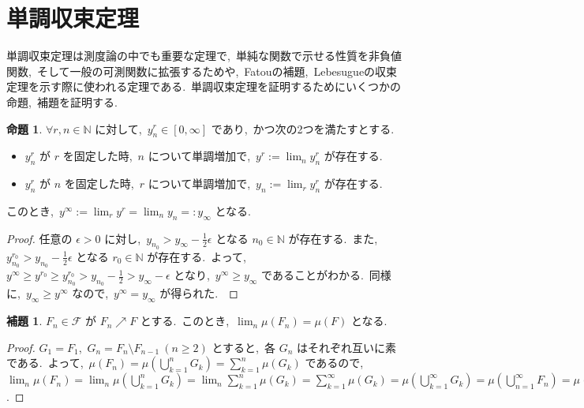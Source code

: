 \documentclass[a4j,11pt]{jarticle}
\theoremstyle{definition}
\newtheorem{lemma}[theorem]{補題}
\newtheorem{proposition}[theorem]{命題}
\begin{document}
\section*{単調収束定理}
単調収束定理は測度論の中でも重要な定理で,\ 単純な関数で示せる性質を非負値関数,\ そして一般の可測関数に拡張するためや,\ Fatouの補題,\ Lebesugueの収束定理を示す際に使われる定理である.\ 
単調収束定理を証明するためにいくつかの命題,\ 補題を証明する.\ 

\begin{proposition}\label{prop:doubly}
  $\forall r, n \in \mathbb{N}$
  に対して,\ 
  $y_n^r \in \left[ 0,\infty \right]$
  であり,\ かつ次の2つを満たすとする.\ 
  \begin{itemize}
    \item 
      $y_n^r$
      が
      $r$
      を固定した時,\ 
      $n$
      について単調増加で,\ 
      $y^r:=\lim_n y_n^r$
      が存在する.\ 
    \item
      $y_n^r$
      が
      $n$
      を固定した時,\ 
      $r$
      について単調増加で,\ 
      $y_n:=\lim_r y_n^r$
      が存在する.\ 
  \end{itemize}
  このとき,\ 
  $y^\infty:=\lim_r y^r = \lim_n y_n=:y_\infty$
  となる.\ 
\end{proposition}

\begin{proof}
  任意の
  $\epsilon > 0$
  に対し,\ 
  $y_{n_0} > y_\infty - \frac{1}{2}\epsilon$
  となる
  $n_0 \in \mathbb{N}$
  が存在する.\ 
  また,\ 
  $y_{n_0}^{r_0} > y_{n_0} - \frac{1}{2}\epsilon$
  となる
  $r_0 \in \mathbb{N}$
  が存在する.\ 
  よって,\ 
  $y^{\infty} \geq y^{r_0} \geq y_{n_0}^{r_0} > y_{n_0} - \frac{1}{2} > y_{\infty} - \epsilon$
  となり,\ 
  $y^{\infty} \geq y_{\infty}$
  であることがわかる.\ 
  同様に,\ 
  $y_{\infty} \geq y^{\infty}$
  なので,\ 
  $y^{\infty} = y_{\infty}$
  が得られた.\ 
\end{proof}


\begin{lemma} \label{lemma:mono_set}
  $F_n \in \mathcal{F}$
  が
  $F_n \nearrow F$
  とする.\ 
  このとき,\ 
  $\lim_{n} \mu(F_n) = \mu(F)$
  となる.\ 
\end{lemma}


\begin{proof}
  $G_1 = F_1$,\ 
  $G_n = F_n \setminus F_{n-1}\ (n\geq2)$
  とすると,\ 各
  $G_n$
  はそれぞれ互いに素である.\ 
  よって,\ 
  $\mu(F_n) = \mu(\bigcup_{k=1}^n G_k) = \sum_{k=1}^n \mu(G_k)$
  であるので,\ 
  $\lim_{n} \mu(F_n) = \lim_n \mu\left( \bigcup_{k=1}^n G_k\right) = \lim_n \sum_{k=1}^n \mu(G_k)  = \sum_{k=1}^{\infty} \mu(G_k) = \mu\left( \bigcup_{k=1}^{\infty} G_k\right) = \mu\left( \bigcup_{n=1}^{\infty}F_n\right) = \mu(F)$.
\end{proof}
\end{document}
